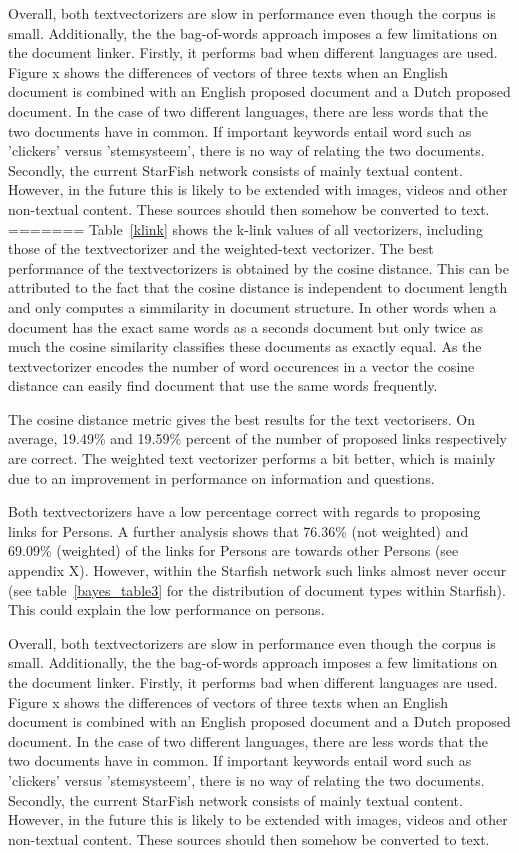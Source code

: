 Overall, both textvectorizers are slow in performance even though the corpus is small. Additionally, the the bag-of-words approach imposes a few limitations on the document linker. Firstly, it performs bad when different languages are used. Figure x shows the differences of vectors of three texts when an English document is combined with an English proposed document and a Dutch proposed document. In the case of two different languages, there are less words that the two documents have in common. If important keywords entail word such as 'clickers' versus 'stemsysteem', there is no way of relating the two documents. Secondly, the current StarFish network consists of mainly textual content. However, in the future this is likely to be extended with images, videos and other non-textual content. These sources should then somehow be converted to text.
=======
Table~\ref{klink} shows the k-link values of all vectorizers, including those
of the textvectorizer and the weighted-text vectorizer. The best performance of
the textvectorizers is obtained by the cosine distance. This can be
attributed to the fact that the cosine distance is independent to document
length and only computes a simmilarity in document structure. In other words
when a document has the exact same words as a seconds document but only twice
as much the cosine similarity classifies these documents as exactly equal. As
the textvectorizer encodes the number of word occurences in a vector the
cosine distance can  easily find document that use the same words frequently.

The cosine distance metric gives the best results for the text vectorisers. On
average, 19.49\% and 19.59\% percent of the number of proposed links
respectively are correct. The weighted text vectorizer performs a bit better,
which is mainly due to an improvement in performance on information and
questions. %

Both textvectorizers have a low percentage correct with regards to proposing
links for Persons. A further analysis shows that 76.36\% (not weighted) and
69.09\% (weighted) of the links for Persons are towards other Persons (see
appendix X). However, within the Starfish network such links almost never occur
(see table~\ref{bayes_table3} for the distribution of document types within
Starfish). This could explain the low performance on persons. 

Overall, both textvectorizers are slow in performance even though the corpus is
small. Additionally, the the bag-of-words approach imposes a few limitations on
the document linker. Firstly, it performs bad when different languages are
used. Figure x shows the differences of vectors of three texts when an English
document is combined with an English proposed document and a Dutch proposed
document. In the case of two different languages, there are less words that the
two documents have in common. If important keywords entail word such as
'clickers' versus 'stemsysteem', there is no way of relating the two documents.
Secondly, the current StarFish network consists of mainly textual content.
However, in the future this is likely to be extended with images, videos and
other non-textual content. These sources should then somehow be converted to
text.

